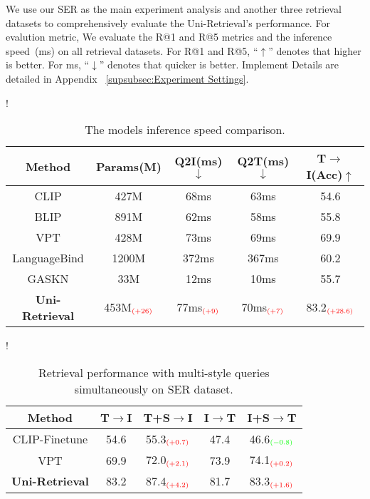 We use our SER as the main experiment analysis and another three retrieval datasets to comprehensively evaluate the Uni-Retrieval's performance. For evalution metric, We evaluate the R@1 and R@5 metrics and the inference speed~(ms) on all retrieval datasets. For R@1 and R@5, ``$\uparrow$'' denotes that higher is better. For ms, ``$\downarrow$'' denotes that quicker is better.
Implement Details are detailed in Appendix ~\ref{supsubsec:Experiment Settings}.

\begin{table}[htp]
    \centering
    \resizebox{1.0\columnwidth}!{
    \begin{tabular}{c|cccc}
        \toprule[1.5pt]
        \textbf{Method} & \textbf{Params(M)} & \textbf{Q2I(ms)$\downarrow$} & \textbf{Q2T(ms)$\downarrow$} & \textbf{T$\rightarrow$I(Acc)}$\uparrow$ \\
        \hline
        CLIP & 427M & 68ms & 63ms & 54.6\\
        BLIP & 891M & 62ms & 58ms & 55.8\\
        VPT & 428M & 73ms & 69ms & 69.9\\
        LanguageBind & 1200M & 372ms & 367ms & 60.2\\
        GASKN & 33M & 12ms & 10ms & 55.7\\
        \hline
        \rowcolor{aliceblue!60} \textbf{Uni-Retrieval} & 453M{$_{\textcolor{red}{(+26)}}$} & 77ms{$_{\textcolor{red}{(+9)}}$} & 70ms{$_{\textcolor{red}{(+7)}}$} & 83.2{$_{\textcolor{red}{(+28.6)}}$}\\ 
        \bottomrule[1.5pt]
        \hline
    \end{tabular}}
    \vspace{-2mm}
    \caption{The models inference speed comparison.}
    \label{tab:speed}
    \vspace{-5mm}
\end{table}

\begin{table}[!h]
    \centering
    \resizebox{1.0\columnwidth}!{
    \begin{tabular}{c|cccc}
        \toprule[1.5pt]
        Method & T$\rightarrow$I & T+S$\rightarrow$I & I$\rightarrow$T & I+S$\rightarrow$T \\
        \hline
        CLIP-Finetune & 54.6 & 55.3{$_{\textcolor{red}{(+0.7)}}$} & 47.4 & 46.6{$_{\textcolor{green}{(-0.8)}}$}\\
        VPT & 69.9 & 72.0{$_{\textcolor{red}{(+2.1)}}$} & 73.9 & 74.1{$_{\textcolor{red}{(+0.2)}}$}\\
        \hline
        \rowcolor{aliceblue!60} \textbf{Uni-Retrieval} & 83.2 & 87.4{$_{\textcolor{red}{(+4.2)}}$} & 81.7 & 83.3{$_{\textcolor{red}{(+1.6)}}$}\\ 
        \bottomrule[1.5pt]
    \end{tabular}}
    \vspace{-2mm}
    \caption{Retrieval performance with multi-style queries simultaneously on SER dataset.}
    \label{tab:multi-query}
    \vspace{-5mm}
\end{table}

